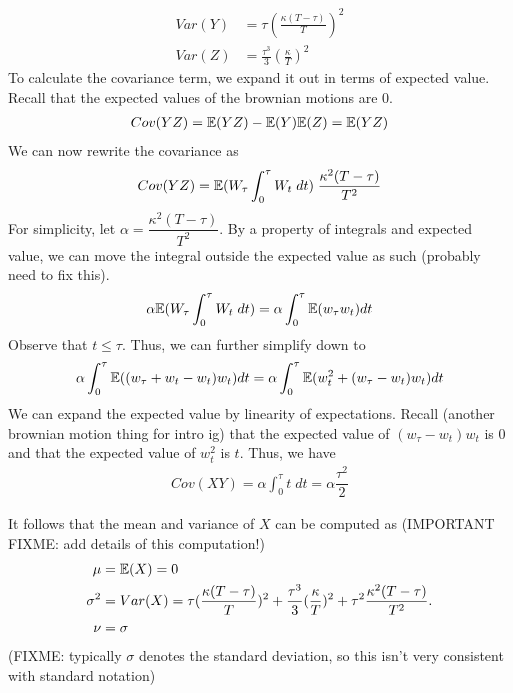 \documentclass[reqno]{amsart}
\begin{document}
\begin{align}
     Var(Y) &= \tau \left(\frac{\kappa(T-\tau)}{T} \right)^2\\
     Var(Z) &= \frac{\tau^3}{3} \left(\frac{\kappa}{T}\right)^2
\end{align}
To calculate the covariance term, we expand it out in terms of expected value. Recall that the expected values of the brownian motions are 0.
\begin{align}
     Cov(YZ) = \mathbb{E}(YZ) - \mathbb{E}(Y)\mathbb{E}(Z) = \mathbb{E}(YZ)
\end{align}
We can now rewrite the covariance as
\begin{align}
     Cov(YZ) = \mathbb{E}(W_\tau \int_0^\tau W_t \; dt) \;\dfrac{\kappa^2 (T - \tau)}{T^2}
\end{align}
For simplicity, let $\alpha = \dfrac{\kappa^2 (T - \tau)}{T^2}$. By a property of integrals and expected value, we can move the integral outside the expected value as such (probably need to fix this).
\begin{align}
     \alpha \mathbb{E}(W_\tau \int_0^\tau W_t \; dt) = \alpha \int_0^\tau \mathbb{E}(w_\tau w_t) dt
\end{align}
Observe that $t \leq \tau$. Thus, we can further simplify down to
\begin{align}
     \alpha \int_0^\tau \mathbb{E}((w_\tau + w_t - w_t) w_t) dt = \alpha \int_0^\tau \mathbb{E}(w_t^2 + (w_\tau - w_t) w_t) dt
\end{align}
We can expand the expected value by linearity of expectations. Recall (another brownian motion thing for intro ig) that the expected value of $(w_\tau - w_t) w_t$ is 0 and that the expected value of $w_t^2$ is $t$. Thus, we have
\begin{align}
     Cov(XY) = \alpha \int_0^\tau t \; dt = \alpha \dfrac{\tau^2}{2}
\end{align}

It follows that the mean and variance of $X$ can be computed as (IMPORTANT FIXME: add details of this computation!)
\begin{align}
     \mu &= \mathbb{E}(X) = 0\\
     \sigma^2 &= Var(X) = \tau(\frac{\kappa(T-\tau)}{T})^2 + \frac{\tau^3}{3}(\frac{\kappa}{T})^2 + \tau^2\frac{\kappa^2(T-\tau)}{T^2}.\\
     \nu &= \sigma
\end{align}
(FIXME: typically $\sigma$ denotes the standard deviation, so this isn't very consistent with standard notation)
\end{document}
